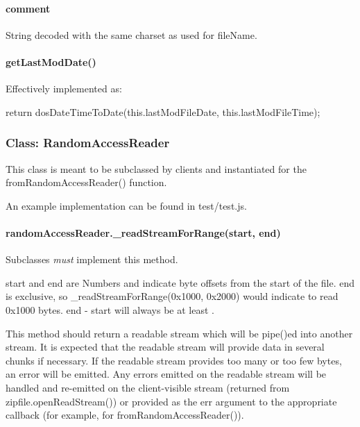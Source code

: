 \paragraph*{comment}

{\ttfamily String} decoded with the same charset as used for {\ttfamily file\+Name}.

\paragraph*{get\+Last\+Mod\+Date()}

Effectively implemented as\+:


\begin{DoxyCode}
return dosDateTimeToDate(this.lastModFileDate, this.lastModFileTime);
\end{DoxyCode}


\subsubsection*{Class\+: Random\+Access\+Reader}

This class is meant to be subclassed by clients and instantiated for the {\ttfamily from\+Random\+Access\+Reader()} function.

An example implementation can be found in {\ttfamily test/test.\+js}.

\paragraph*{random\+Access\+Reader.\+\_\+read\+Stream\+For\+Range(start, end)}

Subclasses {\itshape must} implement this method.

{\ttfamily start} and {\ttfamily end} are Numbers and indicate byte offsets from the start of the file. {\ttfamily end} is exclusive, so {\ttfamily \+\_\+read\+Stream\+For\+Range(0x1000, 0x2000)} would indicate to read {\ttfamily 0x1000} bytes. {\ttfamily end -\/ start} will always be at least {}.

This method should return a readable stream which will be {\ttfamily pipe()}ed into another stream. It is expected that the readable stream will provide data in several chunks if necessary. If the readable stream provides too many or too few bytes, an error will be emitted. Any errors emitted on the readable stream will be handled and re-\/emitted on the client-\/visible stream (returned from {\ttfamily zipfile.\+open\+Read\+Stream()}) or provided as the {\ttfamily err} argument to the appropriate callback (for example, for {\ttfamily from\+Random\+Access\+Reader()}).

